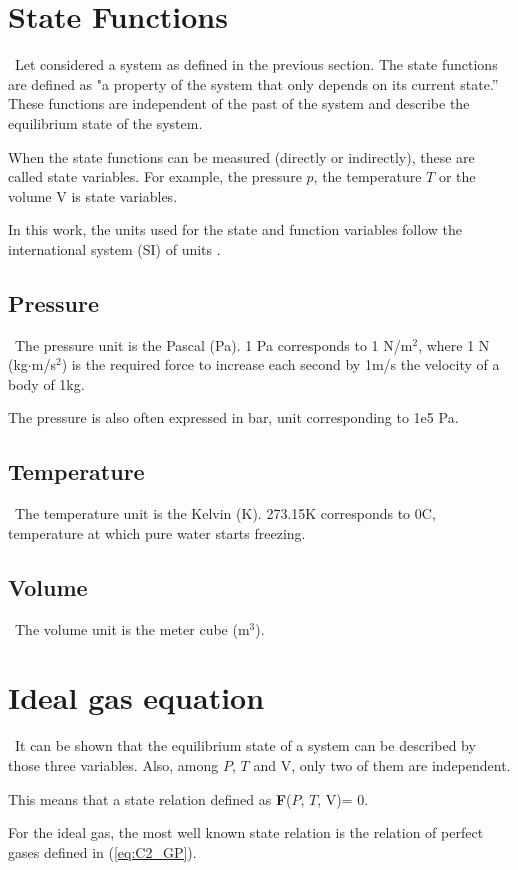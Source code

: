 \section{State Functions}\label{sect:C2_State}
\quad\, Let considered a system as defined in the previous section. The state functions are defined as "a property of the system that only depends on its current state.” These functions are independent of the past of the system and describe the equilibrium state of the system.

When the state functions can be measured (directly or indirectly), these are called state variables. For example, the pressure $p$, the temperature $T$ or the volume $\mathrm{V}$ is state variables.

In this work, the units used for the state and function variables follow the international system (SI) of units \cite{Nist}. 
\subsection{Pressure}
\quad\, The pressure unit is the Pascal (Pa). 1 Pa corresponds to 1 N/m$^2$, where 1 N (kg$\cdot$m/s$^2$) is the required force to increase each second by 1m/s the velocity of a body of 1kg.

The pressure is also often expressed in bar, unit corresponding to 1e5 Pa.
\subsection{Temperature}
\quad\, The temperature unit is the Kelvin (K). 273.15\degree K corresponds to 0\degree C, temperature at which pure water starts freezing.
\subsection{Volume}
\quad\, The volume unit is the meter cube (m$^3$).
\section{Ideal gas equation}
\quad\, It can be shown that the equilibrium state of a system can be described by those three variables. Also, among $P$, $T$ and $\mathrm{V}$, only two of them are independent. 

This means that a state relation defined as \textbf{F}($P$, $T$, $\mathrm{V}$)= 0.

For the ideal gas, the most well known state relation is the relation of perfect gases defined in (\ref{eq:C2_GP}).

